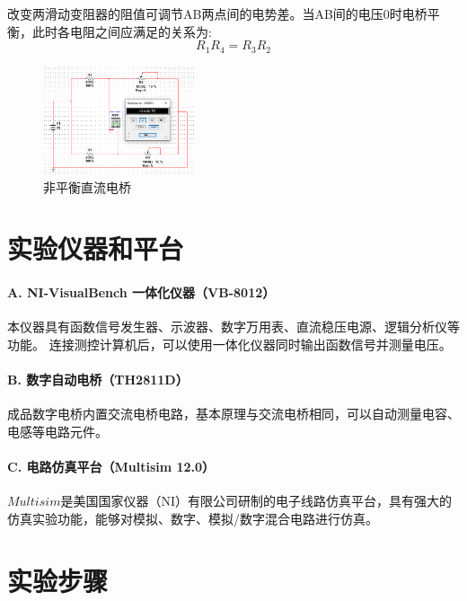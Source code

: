 \documentclass[10pt,a4paper,twocolumn,twoside,UTF8]{ctexart}
\begin{document}
		改变两滑动变阻器的阻值可调节AB两点间的电势差。当AB间的电压0时电桥平衡，此时各电阻之间应满足的关系为:
		\begin{equation}
			R_1R_4 = R_3R_2
		\end{equation}
		
		\begin{figure}[htbp]
			\centering
			\includegraphics[width=0.4\textwidth]{attachments/illus-5.png}
			\caption{非平衡直流电桥}
			\label{fig:illus-5}
		\end{figure}


\section{实验仪器和平台}
	\paragraph{A. NI-VisualBench 一体化仪器（VB-8012）}
	本仪器具有函数信号发生器、示波器、数字万用表、直流稳压电源、逻辑分析仪等功能。
	连接测控计算机后，可以使用一体化仪器同时输出函数信号并测量电压。
	\paragraph{B. 数字自动电桥（TH2811D）}
	成品数字电桥内置交流电桥电路，基本原理与交流电桥相同，可以自动测量电容、电感等电路元件。
	\paragraph{C. 电路仿真平台（Multisim 12.0）}
	$Multisim$是美国国家仪器（NI）有限公司研制的电子线路仿真平台，具有强大的仿真实验功能，能够对模拟、数字、模拟/数字混合电路进行仿真。

\section{实验步骤}
\end{document}
